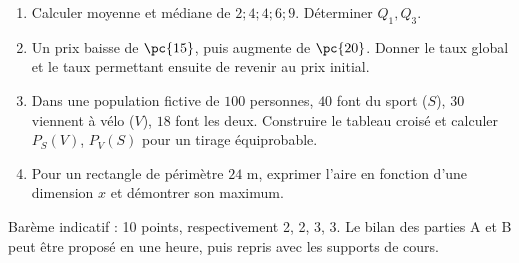\begin{example}\begin{enumerate}
\item Calculer moyenne et médiane de $2;4;4;6;9$. Déterminer $Q_1,Q_3$.
\item Un prix baisse de $\pc{15}$, puis augmente de $\pc{20}$. Donner le taux global et le taux permettant ensuite de revenir au prix initial.
\item Dans une population fictive de $100$ personnes, $40$ font du sport ($S$), $30$ viennent à vélo ($V$), $18$ font les deux. Construire le tableau croisé et calculer $P_S(V)$, $P_V(S)$ pour un tirage équiprobable.
\item Pour un rectangle de périmètre $24$ m, exprimer l'aire en fonction d'une dimension $x$ et démontrer son maximum.
\end{enumerate}\end{example}
\begin{teachernote}Barème indicatif : 10 points, respectivement 2, 2, 3, 3. Le bilan des parties A et B peut être proposé en une heure, puis repris avec les supports de cours.\end{teachernote}

